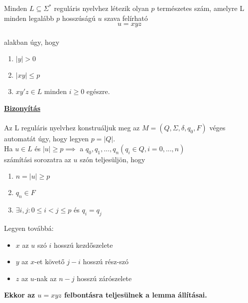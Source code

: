 \documentclass{beamer}
\newcommand{\msmallskip}{\vspace{0.3em}}
\newcommand{\mmedskip}{\vspace{0.5em}}
\newcommand{\mbigskip}{\vspace{1em}}
\begin{document}
\begin{frame}
\begin{tcolorbox}[title={Tétel: Pumpáló lemma reguláris nyelvre}]
Minden $L \subseteq {\Sigma}^*$ reguláris nyelvhez létezik olyan $p$ természetes szám, amelyre L minden legalább $p$ hosszúságú $u$ szava felírható $$u = xyz$$\\
alakban úgy, hogy\\
\begin{enumerate}
\item $|y| > 0$
\item $|xy| \leq p$
\item $xy'z \in L$ minden $i \geq 0$ egészre.
\end{enumerate}
\tcblower
\msmallskip
\underline{\textbf{Bizonyítás}}\\
\mmedskip
\\
Az L reguláris nyelvhez konstruáljuk meg az $M = (Q, {\Sigma}, {\delta}, q_0, F)$ véges automatát úgy, hogy legyen $p = |Q|$.\\
Ha $u \in L$ és $|u| \geq p \implies$ a $q_0, q_1, ...,q_n (q_i \in Q, i = 0, ..., n)$\\
számítási sorozatra az $u$ szón teljesüljön, hogy\\
\begin{enumerate}
\item $n = |u| \geq p$
\item $q_n \in F$
\item ${\exists}i, j : 0 \leq i < j \leq p$ és $q_i = q_j$
\end{enumerate}
\mbigskip
Legyen továbbá:
\begin{itemize}
\item $x$ az $u$ szó $i$ hosszú kezdőszelete
\item $y$ az $x$-et követő $j - i$ hosszú rész-szó
\item $z$ az $u$-nak az $n - j$ hosszú zárószelete 
\end{itemize}
\mbigskip
\textbf{Ekkor az $u = xyz$ felbontásra teljesülnek a lemma állításai.}
\end{tcolorbox}

\end{frame}
\end{document}

